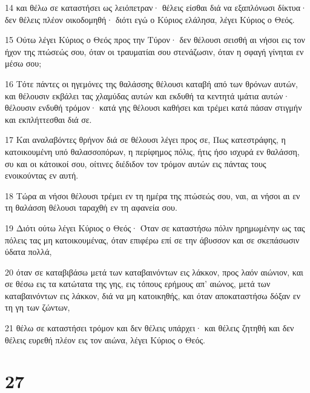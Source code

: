 \par 14 και θέλω σε καταστήσει ως λειόπετραν· θέλεις είσθαι διά να εξαπλόνωσι δίκτυα· δεν θέλεις πλέον οικοδομηθή· διότι εγώ ο Κύριος ελάλησα, λέγει Κύριος ο Θεός.
\par 15 Ούτω λέγει Κύριος ο Θεός προς την Τύρον· δεν θέλουσι σεισθή αι νήσοι εις τον ήχον της πτώσεώς σου, όταν οι τραυματίαι σου στενάζωσιν, όταν η σφαγή γίνηται εν μέσω σου;
\par 16 Τότε πάντες οι ηγεμόνες της θαλάσσης θέλουσι καταβή από των θρόνων αυτών, και θέλουσιν εκβάλει τας χλαμύδας αυτών και εκδυθή τα κεντητά ιμάτια αυτών· θέλουσιν ενδυθή τρόμον· κατά γης θέλουσι καθήσει και τρέμει κατά πάσαν στιγμήν και εκπλήττεσθαι διά σε.
\par 17 Και αναλαβόντες θρήνον διά σε θέλουσι λέγει προς σε, Πως κατεστράφης, η κατοικουμένη υπό θαλασσοπόρων, η περίφημος πόλις, ήτις ήσο ισχυρά εν θαλάσση, συ και οι κάτοικοί σου, οίτινες διέδιδον τον τρόμον αυτών εις πάντας τους ενοικούντας εν αυτή.
\par 18 Τώρα αι νήσοι θέλουσι τρέμει εν τη ημέρα της πτώσεώς σου, ναι, αι νήσοι αι εν τη θαλάσση θέλουσι ταραχθή εν τη αφανεία σου.
\par 19 Διότι ούτω λέγει Κύριος ο Θεός· Όταν σε καταστήσω πόλιν ηρημωμένην ως τας πόλεις τας μη κατοικουμένας, όταν επιφέρω επί σε την άβυσσον και σε σκεπάσωσιν ύδατα πολλά,
\par 20 όταν σε καταβιβάσω μετά των καταβαινόντων εις λάκκον, προς λαόν αιώνιον, και σε θέσω εις τα κατώτατα της γης, εις τόπους ερήμους απ' αιώνος, μετά των καταβαινόντων εις λάκκον, διά να μη κατοικηθής, και όταν αποκαταστήσω δόξαν εν τη γη των ζώντων,
\par 21 θέλω σε καταστήσει τρόμον και δεν θέλεις υπάρχει· και θέλεις ζητηθή και δεν θέλεις ευρεθή πλέον εις τον αιώνα, λέγει Κύριος ο Θεός.

\chapter{27}


